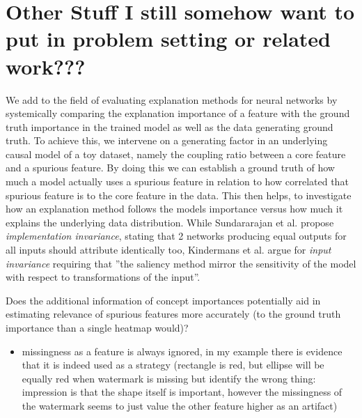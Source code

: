 { \color{gray}


\section{Other Stuff I still somehow want to put in problem setting or related work???}


We add to the field of evaluating explanation methods for neural networks by systemically comparing the explanation importance of a feature with the ground truth importance in the trained model as well as the data generating ground truth. To achieve this, we intervene on a generating factor in an underlying causal model of a toy dataset, namely the coupling ratio between a core feature and a spurious feature. By doing this we can establish a ground truth of how much a model actually uses a spurious feature in relation to how correlated that spurious feature is to the core feature in the data. This then helps, to investigate how an explanation method follows the models importance versus how much it explains the underlying data distribution. While Sundararajan et al. \cite{Sundararajan2017} propose \textit{implementation invariance}, stating that 2 networks producing equal outputs for all inputs should attribute identically too, Kindermans et al. \cite{Kindermans2019} argue for \textit{input invariance} requiring that ''the saliency method mirror the sensitivity of the model with respect to transformations of the input''.

Does the additional information of concept importances potentially aid in estimating
relevance of spurious features  more accurately (to the ground truth importance than a single heatmap would)?

\begin{itemize}
    \item missingness as a feature is always ignored, in my example there is evidence that it is indeed used as a strategy (rectangle is red, but ellipse will be equally red when watermark is missing but identify the wrong thing: impression is that the shape itself is important, however the missingness of the watermark seems to just value the other feature higher as an artifact)
    

\end{itemize}}
